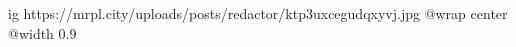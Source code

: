  
 
 
 
 

\ifcmt
  ig https://mrpl.city/uploads/posts/redactor/ktp3uxcegudqxyvj.jpg
  @wrap center
  @width 0.9
\fi
